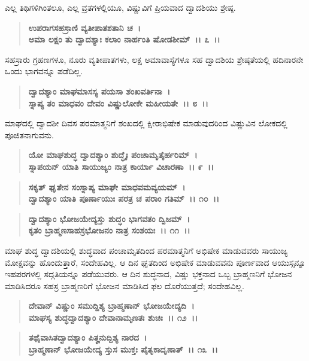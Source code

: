 ಎಲ್ಲ ತಿಥಿಗಳಿಗಿಂತಲೂ, ಎಲ್ಲ ವ್ರತಗಳಲ್ಲಿಯೂ, ವಿಷ್ಣುವಿಗೆ ಪ್ರಿಯವಾದ ದ್ವಾದಶಿಯು ಶ್ರೇಷ್ಠ.

\begin{verse}
\textbf{ಉಪರಾಗಸಹಸ್ರಾಣಿ ವ್ಯತೀಪಾತಶತಾನಿ ಚ~।}\\\textbf{ಅಮಾ ಲಕ್ಷಂ ತು ದ್ವಾದಶ್ಯಾಃ ಕಲಾಂ ನಾರ್ಹಂತಿ ಷೋಡಶೀಮ್~।। ೭~।।}
\end{verse}

ಸಹಸ್ರಾರು ಗ್ರಹಣಗಳೂ, ನೂರು ವ್ಯತೀಪಾತಗಳು, ಲಕ್ಷ ಅಮಾವಾಸ್ಯೆಗಳೂ ಸಹ ದ್ವಾದಶಿಯ ಶ್ರೇಷ್ಠತೆಯಲ್ಲಿ ಹದಿನಾರನೇ ಒಂದು ಭಾಗವನ್ನೂ ಪಡೆದಿಲ್ಲ.

\begin{verse}
\textbf{ದ್ವಾದಶ್ಯಾಂ ಮಾಘಮಾಸಸ್ಯ ಪಯಸಾ ಶಂಖವರ್ತಿನಾ~।}\\\textbf{ಸ್ನಾಪ್ಯ ತಂ ಮಾಧವಂ ದೇವಂ ವಿಷ್ಣುಲೋಕೇ ಮಹೀಯತೇ~।। ೮~।।}
\end{verse}

ಮಾಘದಲ್ಲಿ ದ್ವಾದಶೀ ದಿವಸ ಪರಮಾತ್ಮನಿಗೆ ಶಂಖದಲ್ಲಿ ಕ್ಷೀರಾಭಿಷೇಕ ಮಾಡುವುದರಿಂದ ವಿಷ್ಣುವಿನ ಲೋಕದಲ್ಲಿ ಪೂಜಿತನಾಗುವನು.

\begin{verse}
\textbf{ಯೋ ಮಾಘಶುದ್ಧ ದ್ವಾದಶ್ಯಾಂ ಶುದ್ಧೈಃ ಪಂಚಾಮೃತೈರ್ಹರಿಮ್~।}\\\textbf{ಸ್ನಾಪಯನ್ ಯಾತಿ ಸಾಯುಜ್ಯಂ ನಾತ್ರ ಕಾರ್ಯಾ ವಿಚಾರಣಾ~।। ೯~।।}
\end{verse}

\begin{verse}
\textbf{ಸಕೃತ್ ಘೃತೇನ ಸಂಸ್ನಾಪ್ಯ ಮಾಘೇ ಮಾಧವಮವ್ಯಯಮ್~।}\\\textbf{ದ್ವಾದಶ್ಯಾಂ ಯಾತಿ ಪೂರ್ಣಾಯುಃ ಪರತ್ರ ಚ ಪರಾಂ ಗತಿಮ್~।। ೧೦~।।} 
\end{verse}

\begin{verse}
\textbf{ದ್ವಾದಶ್ಯಾಂ ಭೋಜಯೇದ್ಯಸ್ತು ಶುದ್ಧಂ ಭಾಗವತಂ ದ್ವಿಜಮ್~।}\\\textbf{ಕೃತಂ ಬ್ರಾಹ್ಮಣಸಾಹಸ್ರಭೋಜನಂ ನಾತ್ರ ಸಂಶಯಃ~।। ೧೧~।।}
\end{verse}

ಮಾಘ ಶುದ್ಧ ದ್ವಾದಶಿಯಲ್ಲಿ ಶುದ್ಧವಾದ ಪಂಚಾಮೃತದಿಂದ ಪರಮಾತ್ಮನಿಗೆ ಅಭಿಷೇಕ ಮಾಡುವವರು ಸಾಯುಜ್ಯ ಮೋಕ್ಷವನ್ನು ಹೊಂದುತ್ತಾರೆ, ಸಂದೇಹವಿಲ್ಲ. ಆ ದಿನ ಘೃತದಿಂದ ಅಭಿಷೇಕ ಮಾಡುವವನು ಪೂರ್ಣವಾದ ಆಯುಸ್ಸನ್ನೂ ಇಹಪರಗಳಲ್ಲಿ ಸದ್ಗತಿಯನ್ನೂ ಪಡೆಯುವರು. ಆ ದಿನ ಶುದ್ಧನಾದ, ವಿಷ್ಣು ಭಕ್ತನಾದ ಒಬ್ಬ ಬ್ರಾಹ್ಮಣನಿಗೆ ಭೋಜನ ಮಾಡಿಸಿದರೂ ಸಹಸ್ರ ಬ್ರಾಹ್ಮಣರಿಗೆ ಭೋಜನ ಮಾಡಿಸಿದ ಫಲ ದೊರೆಯುತ್ತದೆ; ಸಂದೇಹವಿಲ್ಲ.

\begin{verse}
\textbf{ದೇವಾನ್ ವಿಷ್ಣುಂ ಸಮುದ್ದಿಶ್ಯ ಬ್ರಾಹ್ಮಣಾನ್ ಭೋಜಯೇದ್ಯದಿ~।}\\\textbf{ಮಾಘಸ್ಯ ಶುದ್ಧದ್ವಾದಶ್ಯಾಂ ದೇವಾನಾಮೃಣತಃ ಶುಚಿಃ~।। ೧೨~।।} 
\end{verse}

\begin{verse}
\textbf{ತಥೈವಾಸಿತದ್ವಾದಶ್ಯಾಂ ಪಿತೄನುದ್ದಿಶ್ಯ ನಾರದ~।}\\\textbf{ಬ್ರಾಹ್ಮಣಾನ್ ಭೋಜಯೇದ್ಯ ಸ್ತುಸ ಮುಕ್ತಃ ಪೈತೃಕಾದೃಣಾತ್~।। ೧೩~।।}
\end{verse}

